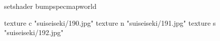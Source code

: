 setshader bumpspecmapworld

    texture c "suiseiseki/190.jpg"
    texture n "suiseiseki/191.jpg"
    texture s "suiseiseki/192.jpg"
